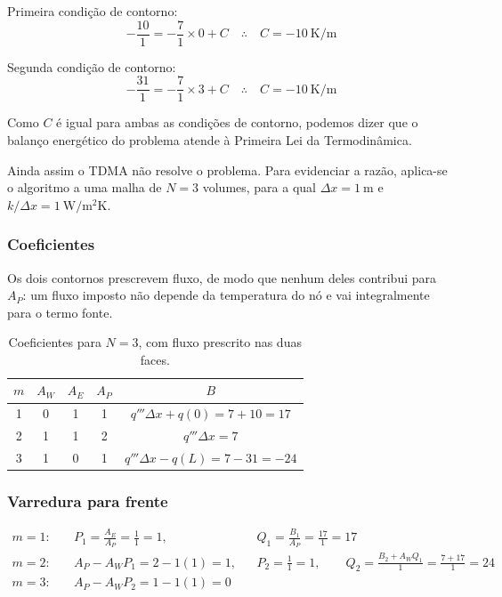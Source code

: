 Primeira condição de contorno:
\[
  -\frac{10}{1}=-\frac{7}{1}\times 0+C
  \quad\therefore\quad
  C=-10\ \mathrm{K/m}
\]
 
Segunda condição de contorno:
\[
  -\frac{31}{1}=-\frac{7}{1}\times 3+C
  \quad\therefore\quad
  C=-10\ \mathrm{K/m}
\]

Como $C$ é igual para ambas as condições de contorno, podemos dizer que o balanço energético do problema atende à Primeira Lei da Termodinâmica.

Ainda assim o TDMA não resolve o problema. Para evidenciar a razão, aplica-se
o algoritmo a uma malha de $N=3$ volumes, para a qual
$\Delta x=1\ \mathrm{m}$ e $k/\Delta x=1\ \mathrm{W/m^2K}$.

\subsubsection*{Coeficientes}

Os dois contornos prescrevem fluxo, de modo que nenhum deles contribui para
$A_P$: um fluxo imposto não depende da temperatura do nó e vai integralmente
para o termo fonte.

\begin{table}[H]
\centering
\caption{Coeficientes para $N=3$, com fluxo prescrito nas duas faces.}
\begin{tabular}{ccccc}
\hline
$m$ & $A_W$ & $A_E$ & $A_P$ & $B$\\
\hline
1 & 0 & 1 & 1 & $q'''\Delta x + q(0) = 7+10 = 17$\\
2 & 1 & 1 & 2 & $q'''\Delta x = 7$\\
3 & 1 & 0 & 1 & $q'''\Delta x - q(L) = 7-31 = -24$\\
\hline
\end{tabular}
\end{table}

\subsubsection*{Varredura para frente}

\[
\begin{aligned}
  m=1:&\quad P_1=\frac{A_E}{A_P}=\frac{1}{1}=1, &
              &Q_1=\frac{B_1}{A_P}=\frac{17}{1}=17\\[4pt]
  m=2:&\quad A_P-A_WP_1=2-1(1)=1, &
              &P_2=\frac{1}{1}=1,\qquad
               Q_2=\frac{B_2+A_WQ_1}{1}=\frac{7+17}{1}=24\\[4pt]
  m=3:&\quad A_P-A_WP_2=1-1(1)=0 &&
\end{aligned}
\]

